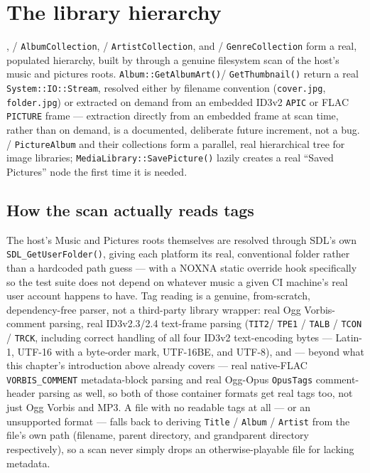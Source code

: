 \section{The library hierarchy}
\label{sec:medialibrary}

,  / \texttt{AlbumCollection},
 / \texttt{ArtistCollection}, and  / \texttt{GenreCollection}
form a real, populated hierarchy, built by  through a genuine
filesystem scan of the host's music and pictures roots. \texttt{Album::GetAlbumArt()}/%
\texttt{GetThumbnail()} return a real \texttt{System::IO::Stream}, resolved either by
filename convention (\texttt{cover.jpg}, \texttt{folder.jpg}) or extracted on demand from an
embedded ID3v2 \texttt{APIC} or FLAC \texttt{PICTURE} frame --- extraction directly from an
embedded frame at scan time, rather than on demand, is a documented, deliberate future
increment, not a bug.  / \texttt{PictureAlbum} and their collections form a
parallel, real hierarchical tree for image libraries; \texttt{MediaLibrary::SavePicture()}
lazily creates a real ``Saved Pictures'' node the first time it is needed.

\subsection{How the scan actually reads tags}

The host's Music and Pictures roots themselves are resolved through SDL's own
\texttt{SDL\_GetUserFolder()}, giving each platform its real, conventional folder rather than a
hardcoded path guess --- with a NOXNA static override hook specifically so the test suite does
not depend on whatever music a given CI machine's real user account happens to have. Tag
reading is a genuine, from-scratch, dependency-free parser, not a third-party library
wrapper: real Ogg Vorbis-comment parsing, real ID3v2.3/2.4 text-frame parsing (\texttt{TIT2}/%
\texttt{TPE1} / \texttt{TALB} / \texttt{TCON} / \texttt{TRCK}, including correct handling of all four
ID3v2 text-encoding bytes --- Latin-1, UTF-16 with a byte-order mark, UTF-16BE, and UTF-8), and
--- beyond what this chapter's introduction above already covers --- real native-FLAC
\texttt{VORBIS\_COMMENT} metadata-block parsing and real Ogg-Opus \texttt{OpusTags} comment-header
parsing as well, so both of those container formats get real tags too, not just Ogg Vorbis and
MP3. A file with no readable tags at all --- or an unsupported format --- falls back to
deriving \texttt{Title} / \texttt{Album} / \texttt{Artist} from the file's own path (filename,
parent directory, and grandparent directory respectively), so a scan never simply drops an
otherwise-playable file for lacking metadata.

